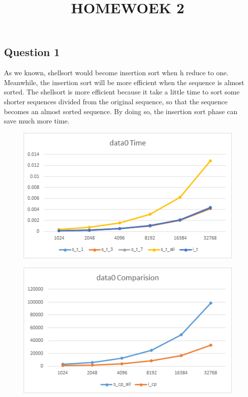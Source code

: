 \documentclass[conference]{IEEEtran}
\begin{document}
\title{HOMEWOEK 2}

\author{
}

\maketitle

\subsection*{Question 1}
As we known, shellsort would become insertion sort when h reduce to one. 
Meanwhile, the insertion sort will be more efficient when the sequence is 
almost sorted. The shellsort is more efficient because it take a little 
time to sort some shorter sequences divided from the original sequence, 
so that the sequence becomes an almost sorted sequence. By doing so, the 
insertion sort phase can save much more time.

\begin{figure}[H]
    \centerline{\includegraphics[scale=0.65]{Pic/pic1.png}}
\end{figure}

\begin{figure}[H]
    \centerline{\includegraphics[scale=0.65]{Pic/pic3.png}}
\end{figure}
\end{document}
